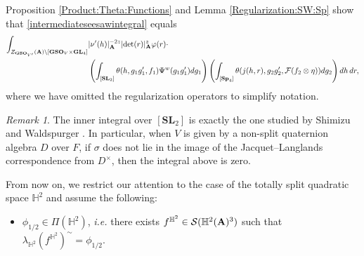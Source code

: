 \documentclass[11pt, reqno]{amsart}
\makeatletter
\newcommand{\mylabel}[2]{#2\def\@currentlabel{#2}\label{#1}}
\theoremstyle{plain}
\theoremstyle{definition}
\theoremstyle{remark}
\newtheorem{remark}[theorem]{Remark}
\theoremstyle{plain}
\def\SL{{\mathbf{SL}}}
\def\A{{\bf A}}
\def\det{\mathrm{det}}
\def\Sp{{\mathbf{Sp}}}
\def\GSO{{\mathbf{GSO}}}
\def\GL{\mathbf{GL}}
\makeatother
\begin{document}
Proposition \ref{Product:Theta:Functions} and Lemma \ref{Regularization:SW:Sp} show that \eqref{intermediateseesawintegral} equals 
\begin{align*}
    \int_{Z_{\GSO_{V'}}(\A)\backslash [\mathbf{GSO}_V\times \GL_4]}   &|\nu'(h)|_\A^{-2z}|\det(r)|^{z}_{\A} \varphi(r) \cdot \\ &\left(\int_{[\SL_2]} \theta(h, g_1g_1',f_1) \Psi^w( g_1g_1' )dg_1\right) \left(\int_{[\Sp_4]} \theta(j(h,r), g_2g_2', \mathcal{F}(f_2\otimes \eta)) d g_2\right)dh\, d r,
\end{align*}
where we have omitted the regularization operators to simplify notation. 
\begin{remark}
    The inner integral over $[\SL_2]$ is exactly the one studied by Shimizu \cite{Shimizu:JL} and Waldspurger \cite{WaldsToricPeriods}. In particular, when $V$ is given by a non-split quaternion algebra $D$ over $F$, if $\sigma$ does not lie in the image of the Jacquet--Langlands correspondence from $D^\times$, then the integral above is zero.
\end{remark}
\noindent From now on, we restrict our attention to the case of the totally split quadratic space $\mathbb{H}^2$ and assume the following:
\begin{itemize}
    \item[(\mylabel{Spl}{\textbf{Spl}})] $\phi_{1/2} \in  \Pi(\mathbb{H}^2)$, \textit{i.e.} there exists $f^{\mathbb{H}^2} \in \mathcal{S}(\mathbb{H}^2(\A)^3)$ such that $ \lambda_{\mathbb{H}^2}(f^{\mathbb{H}^2})^{\sim} = \phi_{1/2}.$
\end{itemize} 
 
\end{document}
